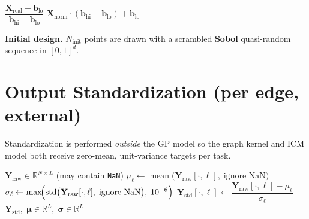 \documentclass[11pt]{article}
\begin{document}
\begin{algorithm}[H]
\caption{Input normalization / unnormalization}
\begin{algorithmic}[1]
    \State \Return $\dfrac{\mathbf{X}_{\mathrm{real}} - \mathbf{b}_{\mathrm{lo}}}{\mathbf{b}_{\mathrm{hi}} - \mathbf{b}_{\mathrm{lo}}}$
\EndFunction
\vspace{4pt}
    \State \Return $\mathbf{X}_{\mathrm{norm}} \cdot (\mathbf{b}_{\mathrm{hi}} - \mathbf{b}_{\mathrm{lo}}) + \mathbf{b}_{\mathrm{lo}}$
\EndFunction
\end{algorithmic}
\end{algorithm}

\noindent\textbf{Initial design.} $N_{\mathrm{init}}$ points are drawn with a scrambled
\textbf{Sobol} quasi-random sequence in $[0,1]^d$.

\section{Output Standardization (per edge, external)}

Standardization is performed \emph{outside} the GP model so the graph kernel and
ICM model both receive zero-mean, unit-variance targets per task.

\begin{algorithm}[H]
\caption{Per-edge output standardization}
\begin{algorithmic}[1]
\Require $\mathbf{Y}_{\mathrm{raw}} \in \mathbb{R}^{N \times L}$ \quad (may contain \texttt{NaN})
    \State $\mu_\ell \gets \operatorname{mean}\bigl(\mathbf{Y}_{\mathrm{raw}}[\cdot,\ell],\; \text{ignore NaN}\bigr)$
    \State $\sigma_\ell \gets \max\!\Bigl(\operatorname{std}\bigl(\mathbf{Y}_{\mathrm{raw}}[\cdot,\ell],\; \text{ignore NaN}\bigr),\; 10^{-6}\Bigr)$
    \State $\mathbf{Y}_{\mathrm{std}}[\cdot,\ell] \gets \dfrac{\mathbf{Y}_{\mathrm{raw}}[\cdot,\ell] - \mu_\ell}{\sigma_\ell}$
\EndFor
\State \Return $\mathbf{Y}_{\mathrm{std}},\; \bm{\mu} \in \mathbb{R}^L,\; \bm{\sigma} \in \mathbb{R}^L$
\end{algorithmic}
\end{algorithm}
\end{document}
